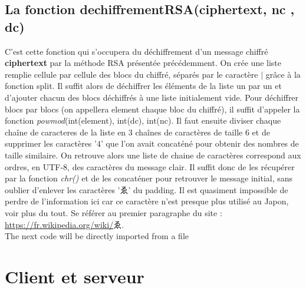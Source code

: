 \documentclass[12pt]{article}
\theoremstyle{definition}
\begin{document}
\begin{CJK}{UTF8}{min}
\subsection{La fonction dechiffrementRSA(ciphertext, nc , dc)}
	C'est cette fonction qui s'occupera du déchiffrement d'un message chiffré \textbf{ciphertext} par la méthode RSA présentée précédemment. On crée une liste remplie cellule par cellule des blocs du chiffré, séparés par le caractère $\mid$ grâce à la fonction split. Il suffit alors de déchiffrer les éléments de la liste un par un et d'ajouter chacun des blocs déchiffrés à une liste initialement vide. Pour déchiffrer blocs par blocs (on appellera element chaque bloc du chiffré), il suffit d'appeler la fonction \textit{powmod}(int(element), int(dc), int(nc). Il faut ensuite diviser chaque chaîne de caracteres de la liste en $3$ chaînes de caractères de taille $6$ et de supprimer les caractères '$4$' que l'on avait concaténé pour obtenir des nombres de taille similaire. On retrouve alors une liste de chaine de caractères correspond aux ordres, en UTF-8, des caractères du message clair. Il suffit donc de les récupérer par la fonction \textit{chr()} et de les concaténer pour retrouver le message initial, sans oublier d'enlever les caractères 'ゑ' du padding. Il est quasiment impossible de perdre de l'information ici car ce caractère n'est presque plus utilisé au Japon, voir plus du tout. Se référer au premier paragraphe du site : \url{https://fr.wikipedia.org/wiki/}ゑ.\\
	
The next code will be directly imported from a file

%
\vfill \eject
\end{CJK}
\section{Client et serveur}
\end{document}
